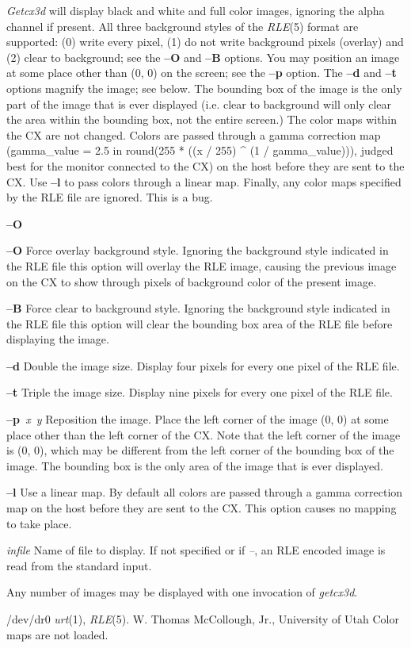 {\it Getcx3d}
will display black and white and full color
images, ignoring the alpha channel if
present.  All three background styles of the
{\it RLE}{\rm (5)}
format are supported: (0) write every pixel,
(1) do not write background pixels (overlay) and (2) clear to background;
see the
{\bf --O}
and
{\bf --B}
options.
You may position an image at some place other than (0, 0)
on the screen; see the
{\bf --p}
option.
The
{\bf --d}
and
{\bf --t}
options magnify the image; see below.  The bounding box of the image
is the only part of the image that is ever displayed (i.e. clear to
background will only clear the area within the bounding box, not the
entire screen.)  The color maps within the CX are not changed.  Colors
are passed through a gamma correction map (gamma\_value = 2.5 in
round(255 * ((x / 255) \^{} (1 / gamma\_value))), judged best for the
monitor connected to the CX) on the host before they are sent to the
CX.  Use
{\bf --l}
to pass colors through a linear map.  Finally, any color maps
specified by the RLE file are ignored.  This is a bug.
\begin{TPlist}{{\bf --O}}
\item[{{\bf --O}}]
Force overlay background style.  Ignoring the background style
indicated in the RLE file this option will overlay the RLE image,
causing the previous image on the CX to show through pixels of
background color of the present image.
\item[{{\bf --B}}]
Force clear to background style.  Ignoring the background style
indicated in the RLE file this option will clear the bounding box area
of the RLE file before displaying the image.
\item[{{\bf --d}}]
Double the image size.  Display four pixels for every one pixel of the
RLE file.
\item[{{\bf --t}}]
Triple the image size.  Display nine pixels for every one pixel of the
RLE file.
\item[{{\bf --p}{\it \ x\ y}
}]
Reposition the image.  Place the left corner of the image (0, 0) at
some place other than the left corner of the CX.  Note that the left
corner of the image is (0, 0), which may be different from the left
corner of the bounding box of the image.  The bounding box is the only
area of the image that is ever displayed.
\item[{{\bf --l}}]
Use a linear map.  By default all colors are passed through a gamma
correction map on
the host before they are sent to the CX.  This option causes no
mapping to take place.
\item[{{\it infile}}]
Name of file to display.  If not specified or if
{\it --}{\rm ,}
an RLE encoded image is read from the standard input.

Any number of images may be displayed with one invocation of
{\it getcx3d}{\rm .}
\end{TPlist}
/dev/dr0
{\it urt}{\rm (1),}
{\it RLE}{\rm (5).}
W. Thomas McCollough, Jr., University of Utah
Color maps are not loaded.

